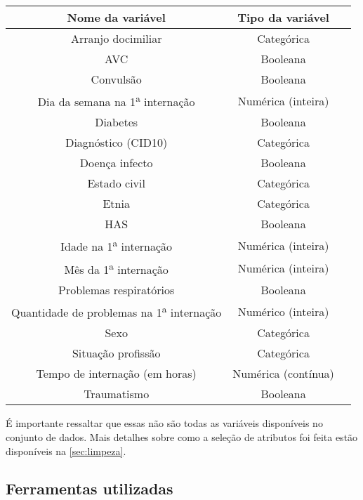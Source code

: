 \begin{table}[H]
	{
		\begin{tabular}{ccc}
			\toprule
			Nome da variável & Tipo da variável \\
			\midrule \midrule
   			Arranjo docimiliar & Categórica \\
   			\midrule
			AVC & Booleana \\
			\midrule
			Convulsão & Booleana \\
			\midrule
			Dia da semana na 1\textsuperscript{a} internação & Numérica (inteira) \\
			\midrule
			Diabetes & Booleana \\
			\midrule
			Diagnóstico (CID10) & Categórica \\
			\midrule
			Doença infecto & Booleana \\
			\midrule
			Estado civil & Categórica \\
			\midrule
			Etnia & Categórica \\
			\midrule
			HAS & Booleana \\
			\midrule
			Idade na 1\textsuperscript{a} internação & Numérica (inteira) \\
			\midrule
			Mês da 1\textsuperscript{a} internação & Numérica (inteira) \\
			\midrule
			Problemas respiratórios & Booleana \\
			\midrule
			Quantidade de problemas na 1\textsuperscript{a} internação & Numérico (inteira) \\
			\midrule
			Sexo & Categórica \\
			\midrule
			Situação profissão & Categórica \\
			\midrule
			Tempo de internação (em horas) & Numérica (contínua) \\
			\midrule
			Traumatismo & Booleana \\
			\bottomrule
		\end{tabular}
	}
	{
	}
\end{table}

É importante ressaltar que essas não são todas as variáveis disponíveis no conjunto de dados. Mais detalhes sobre como a seleção de atributos foi feita estão disponíveis na \autoref{sec:limpeza}.

\subsection{Ferramentas utilizadas}\label{sec:ferramentas}

